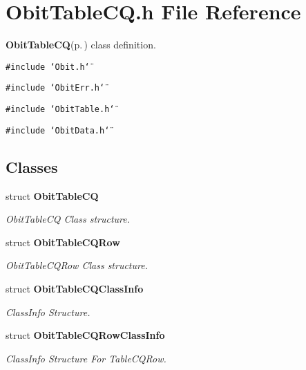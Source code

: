 \section{Obit\-Table\-CQ.h File Reference}
\label{ObitTableCQ_8h}
{\bf Obit\-Table\-CQ}{\rm (p.\,\pageref{structObitTableCQ})} class definition. 

{\tt \#include \char`\"{}Obit.h\char`\"{}}\par
{\tt \#include \char`\"{}Obit\-Err.h\char`\"{}}\par
{\tt \#include \char`\"{}Obit\-Table.h\char`\"{}}\par
{\tt \#include \char`\"{}Obit\-Data.h\char`\"{}}\par
\subsection*{Classes}
\begin{CompactItemize}
\item 
struct {\bf Obit\-Table\-CQ}
\begin{CompactList}\small\item\em Obit\-Table\-CQ Class structure. \item\end{CompactList}\item 
struct {\bf Obit\-Table\-CQRow}
\begin{CompactList}\small\item\em Obit\-Table\-CQRow Class structure. \item\end{CompactList}\item 
struct {\bf Obit\-Table\-CQClass\-Info}
\begin{CompactList}\small\item\em Class\-Info Structure. \item\end{CompactList}\item 
struct {\bf Obit\-Table\-CQRow\-Class\-Info}
\begin{CompactList}\small\item\em Class\-Info Structure For Table\-CQRow. \item\end{CompactList}\end{CompactItemize}
